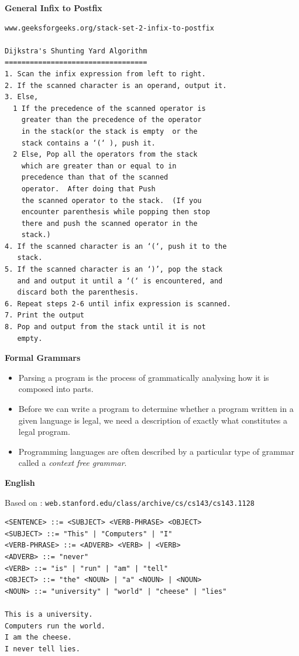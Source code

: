 \newpage
{\samepage
\begin{center}
{\Large{\bf General Infix to Postfix}}
\end{center}
{\small
\begin{verbatim}
www.geeksforgeeks.org/stack-set-2-infix-to-postfix

Dijkstra's Shunting Yard Algorithm
==================================
1. Scan the infix expression from left to right. 
2. If the scanned character is an operand, output it. 
3. Else, 
  1 If the precedence of the scanned operator is
    greater than the precedence of the operator
    in the stack(or the stack is empty  or the
    stack contains a ‘(‘ ), push it. 
  2 Else, Pop all the operators from the stack
    which are greater than or equal to in
    precedence than that of the scanned
    operator.  After doing that Push
    the scanned operator to the stack.  (If you
    encounter parenthesis while popping then stop
    there and push the scanned operator in the
    stack.) 
4. If the scanned character is an ‘(‘, push it to the
   stack. 
5. If the scanned character is an ‘)’, pop the stack
   and and output it until a ‘(‘ is encountered, and
   discard both the parenthesis. 
6. Repeat steps 2-6 until infix expression is scanned. 
7. Print the output 
8. Pop and output from the stack until it is not
   empty.
\end{verbatim}
} }

\newpage
{\samepage
\begin{center}
{\Large{\bf Formal Grammars}}
\end{center}
\begin{itemize}

\item Parsing a program is the process of grammatically analysing how it is composed into parts.

\item Before we can write a program to determine whether a program
written in a given language is legal, we need a description of exactly
what constitutes a legal program.

\item Programming languages are often described by a particular type of
grammar called a {\it context free grammar}.

\end{itemize}
}

\newpage
{\samepage
\begin{center}
{\Large{\bf English}}
\end{center}
{\tiny Based on : \verb^web.stanford.edu/class/archive/cs/cs143/cs143.1128^}
{\small
\begin{verbatim}
<SENTENCE> ::= <SUBJECT> <VERB-PHRASE> <OBJECT>
<SUBJECT> ::= "This" | "Computers" | "I"
<VERB-PHRASE> ::= <ADVERB> <VERB> | <VERB>
<ADVERB> ::= "never"
<VERB> ::= "is" | "run" | "am" | "tell"
<OBJECT> ::= "the" <NOUN> | "a" <NOUN> | <NOUN>
<NOUN> ::= "university" | "world" | "cheese" | "lies"

This is a university.
Computers run the world.
I am the cheese.
I never tell lies.
\end{verbatim}
}}

